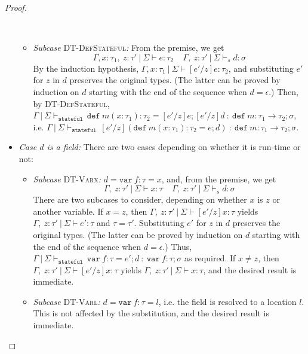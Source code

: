 \documentclass{llncs}
\newcommand{\keywadj}[1]{\mathtt{#1}}
\newcommand{\keyw}[1]{\keywadj{#1}~}
\begin{document}
\begin{proof}
\begin{pcases}
\begin{itemize}
\begin{itemize}
\\
\item[] \textit{Subcase} \textsc{DT-DefStateful}\textit{:} From the premise, we get
\[
\Gamma, x : \tau_1,~z : \tau'~|~\Sigma \vdash e : \tau_2~~~~~\Gamma,~z : \tau'~|~\Sigma \vdash_s d : \sigma
\]
By the induction hypothesis, $\Gamma, x : \tau_1~|~\Sigma \vdash [e'/z]e : \tau_2$, and substituting $e'$ for $z$ in $d$ preserves the original types. (The latter can be proved by induction on $d$ starting with the end of the sequence when $d = \epsilon$.) Then, by \textsc{DT-DefStateful}, $\Gamma~|~\Sigma \vdash_{\keyw{stateful}} \keyw{def} m(x : \tau_1) : \tau_2 = [e'/z]e; [e'/z]d~:~\keyw{def} m : \tau_1 \rightarrow \tau_2; \sigma$, i.e. $\Gamma~|~\Sigma \vdash_{\keyw{stateful}} [e'/z](\keyw{def} m(x : \tau_1) : \tau_2 = e; d)~:~\keyw{def} m : \tau_1 \rightarrow \tau_2; \sigma$.
\\
\end{itemize}


\item[] \textit{Case $d$ is a field:} There are two cases depending on whether it is run-time or not:
\\
\begin{itemize}
\item[] \textit{Subcase} \textsc{DT-Varx}\textit{:} $d = \keyw{var} f : \tau = x$, and, from the premise, we get
\[
\Gamma,~z : \tau'~|~\Sigma \vdash x : \tau~~~~~\Gamma,~z : \tau'~|~\Sigma \vdash_s d : \sigma
\]
There are two subcases to consider, depending on whether $x$ is $z$ or another variable. If $x = z$, then
$\Gamma,~z : \tau'~|~\Sigma \vdash [e'/z]x : \tau$ yields $\Gamma,~z : \tau'~|~\Sigma \vdash e' : \tau$ and $\tau = \tau'$. Substituting $e'$ for $z$ in $d$ preserves the original types. (The latter can be proved by induction on $d$ starting with the end of the sequence when $d = \epsilon$.) Thus, $\Gamma~|~\Sigma \vdash_{\keyw{stateful}} \keyw{var} f : \tau = e'; d~:~\keyw{var} f : \tau; \sigma$ as required. If $x \not = z$, then $\Gamma,~z : \tau'~|~\Sigma \vdash [e'/z]x : \tau$ yields $\Gamma,~z : \tau'~|~\Sigma \vdash x : \tau$, and the desired result is immediate.
\\
\item[] \textit{Subcase} \textsc{DT-Varl}\textit{:} $d = \keyw{var} f : \tau = l$, i.e. the field is resolved to a location $l$. This is not affected by the substitution, and the desired result is immediate.
\\
\end{itemize}


\end{itemize}
\end{pcases}
\end{proof}
\end{document}
